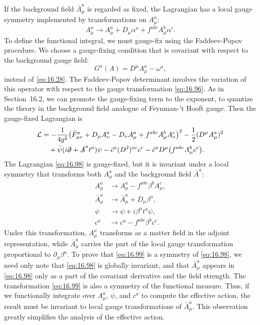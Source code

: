 If the background field $\bar{A}^a_\mu$ is regarded as fixed, the Lagrangian
has a local gauge symmetry implemented by transformations on $A^a_\mu$:
\begin{equation}
  A^a_\mu \to A^a_\mu + D_\mu\alpha^a + f^{abc}A^b_\mu\alpha^c .
  \label{eq:16.96}
\end{equation}
To define the functional integral, we must gauge-fix using the Faddeev-Popov
procedure.  We choose a gauge-fixing condition that is covariant with respect
to the background gauge field:
\begin{equation}
  G^a(A) = D^\mu A^a_\mu - \omega^a ,
  \label{eq:16.97}
\end{equation}
instead of \eqref{eq:16.28}.  The Faddeev-Popov determinant involves the
variation of this operator with respect to the gauge transformation
\eqref{eq:16.96}.  As in Section~16.2, we can promote the gauge-fixing term
to the exponent, to quantize the theory in the background field analogue of
Feynman-'t Hooft gauge.  Then the gauge-fixed Lagrangian is
\begin{equation}
  \begin{aligned}
    \mathcal{L} &= -\frac{1}{4g^2}\bigl( \bar{F}^a_{\mu\nu} + D_\mu A^a_\nu
      - D_\nu A^a_\mu + f^{abc}A^b_\mu A^c_\nu \bigr)^2
      - \frac{1}{2}(D^\mu A^a_\mu)^2\\
    &\quad + \bar{\psi}(i\slashed{\partial} + \slashed{A}^a t^a)\psi
      - \bar{c}^a(D^2)^{ac}c^c - \bar{c}^a D^\mu\bigl( f^{abc}A^b_\mu c^c
        \bigr) .
  \end{aligned}
  \label{eq:16.98}
\end{equation}
The Lagrangian \eqref{eq:16.98} is gauge-fixed, but it is invariant under a
local symmetry that transforms both $A^a_\mu$ and the background field
$\bar{A}^a$:
\begin{equation}
  \begin{aligned}
    A^a_\mu &\to A^a_\mu - f^{abc}\beta^b A^c_\mu,\\
    \bar{A}^a_\mu &\to \bar{A}^a_\mu + D_\mu\beta^a,\\
    \psi &\to \psi + i\beta^a t^a\psi,\\
    c^a &\to c^a - f^{abc}\beta^b c^c .
  \end{aligned}
  \label{eq:16.99}
\end{equation}
Under this transformation, $A^a_\mu$ transforms as a matter field in the
adjoint representation, while $\bar{A}^a_\mu$ carries the part of the local
gauge transformation proportional to $\partial_\mu\beta^a$.  To prove that
\eqref{eq:16.99} is a symmetry of \eqref{eq:16.98}, we need only note that
\eqref{eq:16.98} is globally invariant, and that $\bar{A}^a_\mu$ appears in
\eqref{eq:16.98} only as a part of the covariant derivative and the field
strength.  The transformation \eqref{eq:16.99} is also a symmetry of the
functional measure.  Thus, if we functionally integrate over $A^a_\mu$,
$\psi$, and $c^a$ to compute the effective action, the result must be
invariant to local gauge transformations of $\bar{A}^a_\mu$.  This observation
greatly simplifies the analysis of the effective action.

